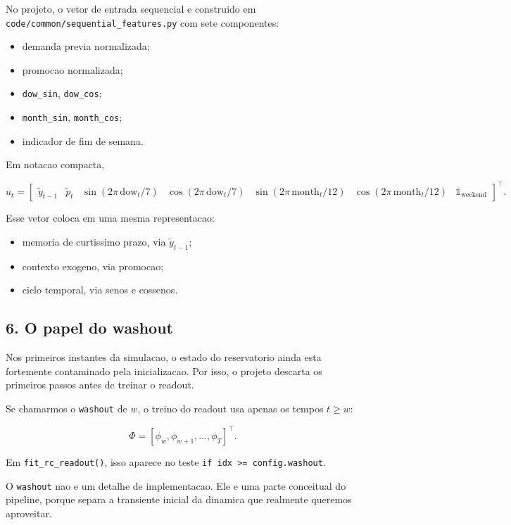 \documentclass[12pt]{article}
\providecommand{\tightlist}{%
          \setlength{\itemsep}{0pt}\setlength{\parskip}{0pt}}
\begin{document}
No projeto, o vetor de entrada sequencial e construido em \texttt{code/common/sequential\_features.py} com sete componentes:

\begin{itemize}
\tightlist
\item
  demanda previa normalizada;
\item
  promocao normalizada;
\item
  \texttt{dow\_sin}, \texttt{dow\_cos};
\item
  \texttt{month\_sin}, \texttt{month\_cos};
\item
  indicador de fim de semana.
\end{itemize}

Em notacao compacta,

\[
u_t =
\begin{bmatrix}
\widetilde{y}_{t-1} &
\widetilde{p}_t &
\sin(2\pi \, \mathrm{dow}_t / 7) &
\cos(2\pi \, \mathrm{dow}_t / 7) &
\sin(2\pi \, \mathrm{month}_t / 12) &
\cos(2\pi \, \mathrm{month}_t / 12) &
\mathbb{1}_{\mathrm{weekend}}
\end{bmatrix}^\top.
\]

Esse vetor coloca em uma mesma representacao:

\begin{itemize}
\tightlist
\item
  memoria de curtissimo prazo, via \(\widetilde{y}_{t-1}\);
\item
  contexto exogeno, via promocao;
\item
  ciclo temporal, via senos e cossenos.
\end{itemize}

\subsection{6. O papel do washout}\label{6-o-papel-do-washout}

Nos primeiros instantes da simulacao, o estado do reservatorio ainda esta fortemente contaminado pela inicializacao. Por isso, o projeto descarta os primeiros passos antes de treinar o readout.

Se chamarmos o \texttt{washout} de \(w\), o treino do readout usa apenas os tempos \(t \ge w\):

\[
\Phi = [\phi_w, \phi_{w+1}, \dots, \phi_T]^\top.
\]

Em \texttt{fit\_rc\_readout()}, isso aparece no teste \texttt{if\ idx\ \textgreater{}=\ config.washout}.

O \texttt{washout} nao e um detalhe de implementacao. Ele e uma parte conceitual do pipeline, porque separa a transiente inicial da dinamica que realmente queremos aproveitar.
\end{document}
